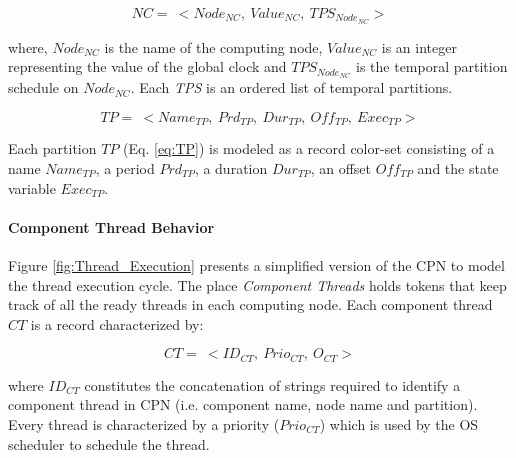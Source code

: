 \vspace{-0.15in}
\begin{equation}
\label{eq:NC}
NC = \ < Node_{NC}, \ Value_{NC}, \ TPS_{Node_{NC}} >
\end{equation}

where, $Node_{NC}$ is the name of the computing node, $Value_{NC}$ is an integer representing the value of the global clock and $TPS_{Node_{NC}}$ is the temporal partition schedule on $Node_{NC}$. Each \emph{TPS} is an ordered list of temporal partitions.

\vspace{-0.15in}
\begin{equation}
\label{eq:TP}
TP = \ < Name_{TP}, \ Prd_{TP}, \ Dur_{TP}, \ Off_{TP}, \ Exec_{TP} >
\end{equation}

Each partition $TP$ (Eq. \ref{eq:TP}) is modeled as a record color-set consisting of a name $Name_{TP}$, a period $Prd_{TP}$, a duration $Dur_{TP}$, an offset $Off_{TP}$ and the state variable  $Exec_{TP}$. %

\paragraph{Component Thread Behavior}

Figure \ref{fig:Thread_Execution} presents a simplified version of the CPN to model the thread execution cycle. The place \emph{Component Threads} holds tokens that keep track of all the ready threads in each computing node. Each component thread $CT$ is a record characterized by:

\vspace{-0.15in}
\begin{equation}
\label{eq:CT}
CT = \ <ID_{CT}, \ Prio_{CT}, \ O_{CT}>
\end{equation}

where $ID_{CT}$ constitutes the concatenation of strings required to identify a component thread in CPN (i.e. component name, node name and partition). Every thread is characterized by a priority ($Prio_{CT}$) which is used by the OS scheduler to schedule the thread. 

